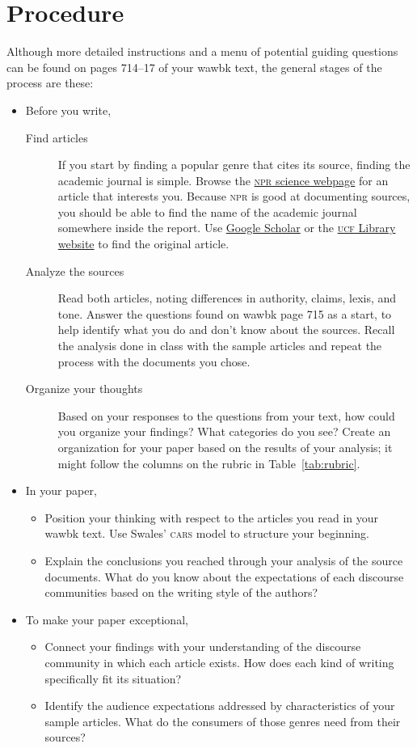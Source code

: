 \documentclass[11pt, oneside]{amsart}	%
\begin{document}
\section{Procedure} %
\label{sec:procedure}
Although more detailed instructions and a menu of potential guiding questions can be found on pages 714–17 of your \ac{wawbk} text, the general stages of the process are these:
\begin{itemize}
	\item Before you write,
\begin{description}
	\item[Find articles] If you start by finding a popular genre that cites its source, finding the academic journal is simple. Browse the \href{http://www.npr.org/sections/science/}{\textsc{npr} science webpage} for an article that interests you. Because \textsc{npr} is good at documenting sources, you should be able to find the name of the academic journal somewhere inside the report. Use \href{http://scholar.google.com}{Google Scholar} or the \href{http://library.ucf.edu}{\textsc{ucf} Library website} to find the original article.
	\item[Analyze the sources] Read both articles, noting differences in authority, claims, lexis, and tone. Answer the questions found on \ac{wawbk} page 715 as a start, to help identify what you do and don't know about the sources. Recall the analysis done in class with the sample articles and repeat the process with the documents you chose.
	\item[Organize your thoughts] Based on your responses to the questions from your text, how could you organize your findings? What categories do you see? Create an organization for your paper based on the results of your analysis; it might follow the columns on the rubric in Table~\ref{tab:rubric}. %
\end{description}
	\item In your paper,
	\begin{itemize}
		\item Position your thinking with respect to the articles you read in your \ac{wawbk} text. Use Swales' \textsc{cars} model to structure your beginning.
		\item Explain the conclusions you reached through your analysis of the source documents. What do you know about the expectations of each discourse communities based on the writing style of the authors?
	\end{itemize}
	\item To make your paper exceptional,
	\begin{itemize}
		\item Connect your findings with your understanding of the discourse community in which each article exists. How does each kind of writing specifically fit its situation?
		\item Identify the audience expectations addressed by characteristics of your sample articles. What do the consumers of those genres need from their sources?
	\end{itemize}
\end{itemize}
\end{document}

